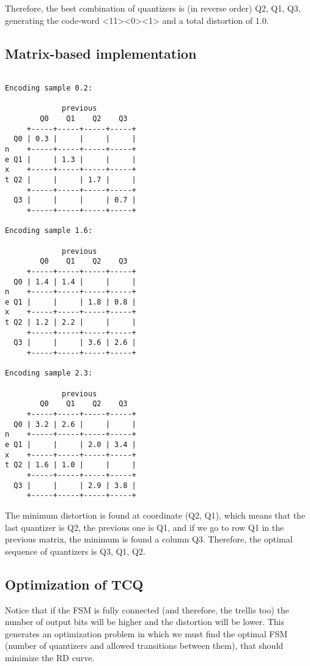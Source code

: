 Therefore, the best combination of quantizers is (in reverse order)
Q2, Q1, Q3, generating the code-word <11><0><1> and a total distortion
of $1.0$.

\subsection*{Matrix-based implementation}

\begin{verbatim}

Encoding sample 0.2:

             previous
        Q0    Q1    Q2    Q3
     +-----+-----+-----+-----+
  Q0 | 0.3 |     |     |     |
n    +-----+-----+-----+-----+
e Q1 |     | 1.3 |     |     |
x    +-----+-----+-----+-----+
t Q2 |     |     | 1.7 |     |
     +-----+-----+-----+-----+
  Q3 |     |     |     | 0.7 |
     +-----+-----+-----+-----+

Encoding sample 1.6:

             previous
        Q0    Q1    Q2    Q3
     +-----+-----+-----+-----+
  Q0 | 1.4 | 1.4 |     |     |
n    +-----+-----+-----+-----+
e Q1 |     |     | 1.8 | 0.8 |
x    +-----+-----+-----+-----+
t Q2 | 1.2 | 2.2 |     |     |
     +-----+-----+-----+-----+
  Q3 |     |     | 3.6 | 2.6 |
     +-----+-----+-----+-----+

Encoding sample 2.3:

             previous
        Q0    Q1    Q2    Q3
     +-----+-----+-----+-----+
  Q0 | 3.2 | 2.6 |     |     |
n    +-----+-----+-----+-----+
e Q1 |     |     | 2.0 | 3.4 |
x    +-----+-----+-----+-----+
t Q2 | 1.6 | 1.0 |     |     |
     +-----+-----+-----+-----+
  Q3 |     |     | 2.9 | 3.8 |
     +-----+-----+-----+-----+
\end{verbatim}

The minimum distortion is found at coordinate (Q2, Q1), which means
that the last quantizer is Q2, the previous one is Q1, and if we go to
row Q1 in the previous matrix, the minimum is found a column
Q3. Therefore, the optimal sequence of quantizers is Q3, Q1, Q2.

\subsection{Optimization of TCQ}
Notice that if the FSM is fully connected (and therefore, the trellis
too) the number of output bits will be higher and the distortion will
be lower. This generates an optimization problem in which we must find
the optimal FSM (number of quantizers and allowed transitions between
them), that should minimize the RD curve.

